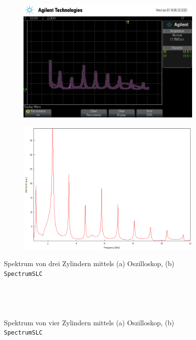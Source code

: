 \begin{figure}
    \begin{subfigure}[c]{width=0.45\textwidth}
        \includegraphics[width=\textwidth]{figure/3Zylinder.png}
    \end{subfigure}
    \begin{subfigure}[c]{width=0.45\textwidth}
        \includegraphics[width=\textwidth]{figure/3_Zylinder.png}
    \end{subfigure}
    \caption{Spektrum von drei Zylindern mittels (a) Oszilloskop, (b) \texttt{SpectrumSLC}}
\end{figure}
\begin{figure}
    \begin{subfigure}[c]{width=0.45\textwidth}
        \includegraphics[width=0\textwidth]{figure/4Zylinder.png}
    \end{subfigure}
    \begin{subfigure}[c]{width=0.45\textwidth}
        \includegraphics[width=0\textwidth]{figure/4_Zylinder.png}
    \end{subfigure}
    \caption{Spektrum von vier Zylindern mittels (a) Oszilloskop, (b) \texttt{SpectrumSLC}}
\end{figure}
